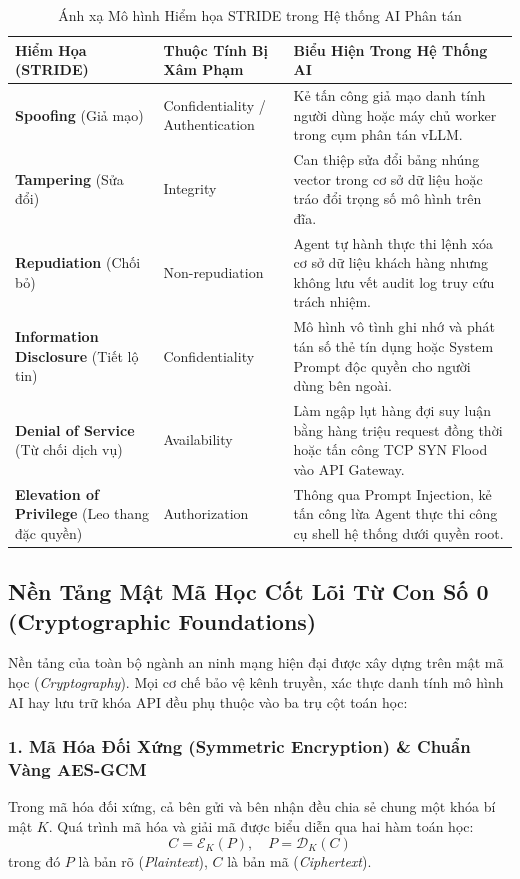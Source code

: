 \begin{table}[htbp]
\centering
\small
\caption{Ánh xạ Mô hình Hiểm họa STRIDE trong Hệ thống AI Phân tán}
\label{tab:stride-ai}
\begin{tabular}{p{2.6cm}p{4.2cm}p{6.0cm}}
\toprule
\textbf{Hiểm Họa (STRIDE)} & \textbf{Thuộc Tính Bị Xâm Phạm} & \textbf{Biểu Hiện Trong Hệ Thống AI} \\
\midrule
\textbf{Spoofing} (Giả mạo) & Confidentiality / Authentication & Kẻ tấn công giả mạo danh tính người dùng hoặc máy chủ worker trong cụm phân tán vLLM. \\
\textbf{Tampering} (Sửa đổi) & Integrity & Can thiệp sửa đổi bảng nhúng vector trong cơ sở dữ liệu hoặc tráo đổi trọng số mô hình trên đĩa. \\
\textbf{Repudiation} (Chối bỏ) & Non-repudiation & Agent tự hành thực thi lệnh xóa cơ sở dữ liệu khách hàng nhưng không lưu vết audit log truy cứu trách nhiệm. \\
\textbf{Information Disclosure} (Tiết lộ tin) & Confidentiality & Mô hình vô tình ghi nhớ và phát tán số thẻ tín dụng hoặc System Prompt độc quyền cho người dùng bên ngoài. \\
\textbf{Denial of Service} (Từ chối dịch vụ) & Availability & Làm ngập lụt hàng đợi suy luận bằng hàng triệu request đồng thời hoặc tấn công TCP SYN Flood vào API Gateway. \\
\textbf{Elevation of Privilege} (Leo thang đặc quyền) & Authorization & Thông qua Prompt Injection, kẻ tấn công lừa Agent thực thi công cụ shell hệ thống dưới quyền root. \\
\bottomrule
\end{tabular}
\end{table}

\subsection{Nền Tảng Mật Mã Học Cốt Lõi Từ Con Số 0 (Cryptographic Foundations)}
\label{subsec:cryptography-foundations}
Nền tảng của toàn bộ ngành an ninh mạng hiện đại được xây dựng trên mật mã học (\textit{Cryptography}). Mọi cơ chế bảo vệ kênh truyền, xác thực danh tính mô hình AI hay lưu trữ khóa API đều phụ thuộc vào ba trụ cột toán học:

\subsubsection{1. Mã Hóa Đối Xứng (Symmetric Encryption) \& Chuẩn Vàng AES-GCM}
Trong mã hóa đối xứng, cả bên gửi và bên nhận đều chia sẻ chung một khóa bí mật $K$. Quá trình mã hóa và giải mã được biểu diễn qua hai hàm toán học:
\begin{equation}
C = \mathcal{E}_K(P), \quad P = \mathcal{D}_K(C)
\end{equation}
trong đó $P$ là bản rõ (\textit{Plaintext}), $C$ là bản mã (\textit{Ciphertext}).

